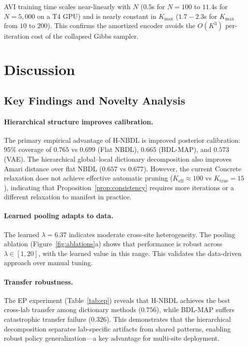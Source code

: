 \documentclass[11pt,a4paper]{article}
\theoremstyle{definition}
\begin{document}
AVI training time scales near-linearly with $N$ ($0.5$s for $N{=}100$ to $11.4$s for $N{=}5{,}000$ on a T4 GPU) and is nearly constant in $K_{\max}$ ($1.7{-}2.3$s for $K_{\max}$ from $10$ to $200$). This confirms the amortized encoder avoids the $O(K^3)$ per-iteration cost of the collapsed Gibbs sampler.

\section{Discussion}\label{sec:discussion}

\subsection{Key Findings and Novelty Analysis}

\paragraph{Hierarchical structure improves calibration.} The primary empirical advantage of H-NBDL is improved posterior calibration: 95\% coverage of $0.765$ vs $0.699$ (Flat NBDL), $0.665$ (BDL-MAP), and $0.573$ (VAE). The hierarchical global--local dictionary decomposition also improves Amari distance over flat NBDL ($0.657$ vs $0.677$). However, the current Concrete relaxation does not achieve effective automatic pruning ($K_{\mathrm{eff}} \approx 100$ vs $K_{\mathrm{true}}{=}15$), indicating that Proposition~\ref{prop:consistency} requires more iterations or a different relaxation to manifest in practice.

\paragraph{Learned pooling adapts to data.} The learned $\lambda{=}6.37$ indicates moderate cross-site heterogeneity. The pooling ablation (Figure~\ref{fig:ablations}a) shows that performance is robust across $\lambda \in [1, 20]$, with the learned value in this range. This validates the data-driven approach over manual tuning.

\paragraph{Transfer robustness.} The EP experiment (Table~\ref{tab:ep}) reveals that H-NBDL achieves the best cross-lab transfer among dictionary methods ($0.756$), while BDL-MAP suffers catastrophic transfer failure ($0.326$). This demonstrates that the hierarchical decomposition separates lab-specific artifacts from shared patterns, enabling robust policy generalization---a key advantage for multi-site deployment.
\end{document}
